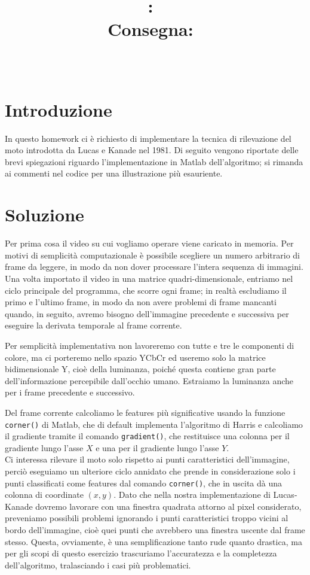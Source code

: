 \documentclass[11pt, twocolumn]{article}
\title{
\vspace{2in}
\textmd{\textbf{\hmwkClass:\ \hmwkTitle}}\\
\normalsize\vspace{0.1in}\small{Consegna:\ \hmwkDueDate}\\
\vspace{0.1in}\large{\textit{\hmwkClassInstructor\ \hmwkClassTime}}
\vspace{3in}
}
\author{\textbf{\hmwkAuthorName}}
\begin{document}
\maketitle

\newpage

\section*{Introduzione}
In questo homework ci è richiesto di implementare la tecnica di rilevazione del moto introdotta da Lucas e Kanade nel 1981. Di seguito vengono riportate delle brevi spiegazioni riguardo l'implementazione in Matlab dell'algoritmo; si rimanda ai commenti nel codice per una illustrazione più esauriente.

\section*{Soluzione}
Per prima cosa il video su cui vogliamo operare viene caricato in memoria. Per motivi di semplicità computazionale è possibile scegliere un numero arbitrario di frame da leggere, in modo da non dover processare l'intera sequenza di immagini. Una volta importato il video in una matrice quadri-dimensionale, entriamo nel ciclo principale del programma, che scorre ogni frame; in realtà escludiamo il primo e l'ultimo frame, in modo da non avere problemi di frame mancanti quando, in seguito, avremo bisogno dell'immagine precedente e successiva per eseguire la derivata temporale al frame corrente.

Per semplicità implementativa non lavoreremo con tutte e tre le componenti di colore, ma ci porteremo nello spazio YCbCr ed useremo solo la matrice bidimensionale Y, cioè della luminanza, poiché questa contiene gran parte dell'informazione percepibile dall'occhio umano. Estraiamo la luminanza anche per i frame precedente e successivo. 

Del frame corrente calcoliamo le features più significative usando la funzione \texttt{corner()} di Matlab, che di default implementa l'algoritmo di Harris e calcoliamo il gradiente tramite il comando \texttt{gradient()}, che restituisce una colonna per il gradiente lungo l'asse $X$ e una per il gradiente lungo l'asse $Y$.\\

Ci interessa rilevare il moto solo rispetto ai punti caratteristici dell'immagine, perciò eseguiamo un ulteriore ciclo annidato che prende in considerazione solo i punti classificati come features dal comando \texttt{corner()}, che in uscita dà una colonna di coordinate $(x,y)$. Dato che nella nostra implementazione di Lucas-Kanade dovremo lavorare con una finestra quadrata attorno al pixel considerato, preveniamo possibili problemi ignorando i punti caratteristici troppo vicini al bordo dell'immagine, cioè quei punti che avrebbero una finestra uscente dal frame stesso. Questa, ovviamente, è una semplificazione tanto rude quanto drastica, ma per gli scopi di questo esercizio trascuriamo l'accuratezza e la completezza dell'algoritmo, tralasciando i casi più problematici.
\end{document}
